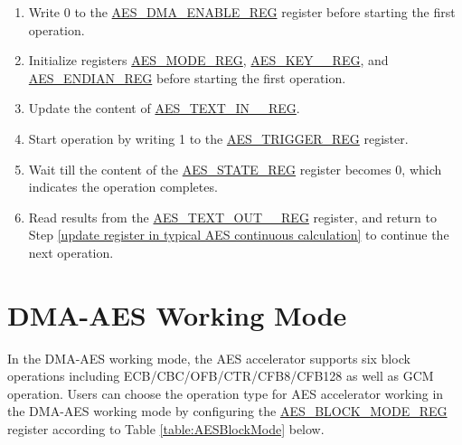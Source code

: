 \documentclass[main\_\_EN.tex]{subfiles}
\begin{document}
\begin{enumerate}
    \item Write 0 to the \hyperref[regdesc:AESDMAENABLEREG]{AES\_DMA\_ENABLE\_REG} register before starting the first operation.
    \item Initialize registers \hyperref[regdesc:AESMODEREG]{AES\_MODE\_REG}, \hyperref[regdesc:AESKEYnREG]{AES\_KEY\_\_REG}, and \hyperref[regdesc:AESENDIANREG]{AES\_ENDIAN\_REG} before starting the first operation.
    \item Update the content of \hyperref[regdesc:AESTEXTINnREG]{AES\_TEXT\_IN\_\_REG}. \label{update register in typical AES continuous calculation}
    \item Start operation by writing 1 to the \hyperref[regdesc:AESTRIGGERREG]{AES\_TRIGGER\_REG} register.
    \item Wait till the content of the \hyperref[regdesc:AESSTATEREG]{AES\_STATE\_REG} register becomes 0, which indicates the operation completes.
    \item Read results from the \hyperref[regdesc:AESTEXTOUTnREG]{AES\_TEXT\_OUT\_\_REG} register, \label{read result in typical AES continuous calculation} and return to Step \ref{update register in typical AES continuous calculation} to continue the next operation.
\end{enumerate}



\section{DMA-AES Working Mode}\label{subsection:dma-aes}

In the DMA-AES working mode, the AES accelerator supports six block operations including ECB/CBC/OFB/CTR/CFB8/CFB128 as well as GCM operation. Users can choose the operation type for AES accelerator working in the DMA-AES working mode by configuring the \hyperref[regdesc:AESBLOCKMODEREG]{AES\_BLOCK\_MODE\_REG} register according to Table \ref{table:AESBlockMode} below.
\end{document}
